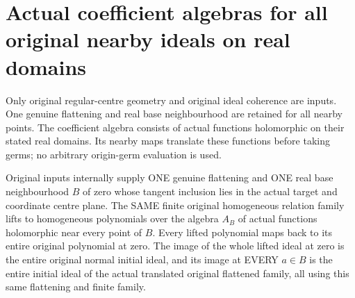 \section{Actual coefficient algebras for all original nearby ideals on real domains}

Only original regular-centre geometry and original ideal coherence are
inputs. One genuine flattening and real base neighbourhood are retained
for all nearby points. The coefficient algebra consists of actual functions
holomorphic on their stated real domains. Its nearby maps translate these
functions before taking germs; no arbitrary origin-germ evaluation is used.

\begin{theorem}
\label{hir:real-domain-original-coefficient-function-initial-family}
\leanok
Original inputs internally supply ONE genuine flattening and ONE real base
neighbourhood $B$ of zero whose tangent inclusion lies in the actual target
and coordinate centre plane. The SAME finite original homogeneous relation
family lifts to homogeneous polynomials over the algebra $A_B$ of actual
functions holomorphic near every point of $B$. Every lifted polynomial maps
back to its entire original polynomial at zero. The image of the whole
lifted ideal at zero is the entire original normal initial ideal, and its
image at EVERY $a\in B$ is the entire initial ideal of the actual translated
original flattened family, all using this same flattening and finite family.
\end{theorem}
